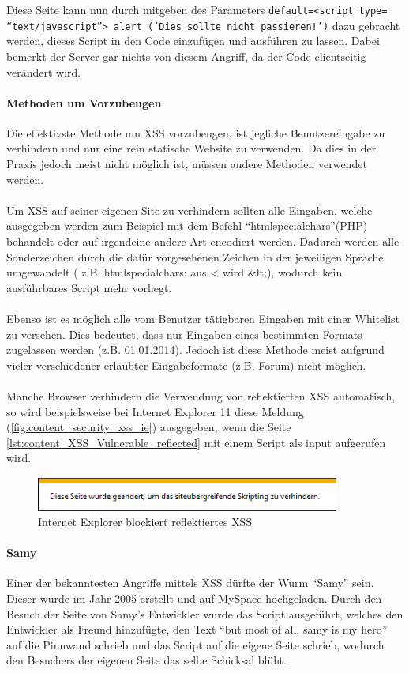 Diese Seite kann nun durch mitgeben des Parameters  \texttt{default=<script type=\\\enquote{text/javascript}> alert ('Dies sollte nicht passieren!')} dazu gebracht werden, dieses Script in den Code einzufügen und ausführen zu lassen. Dabei bemerkt der Server gar nichts von diesem Angriff, da der Code clientseitig verändert wird. 

\paragraph{Methoden um Vorzubeugen}

\label{sec:content_security_cross_site_scripting_Methods}
Die effektivste Methode um XSS vorzubeugen, ist jegliche Benutzereingabe zu verhindern und nur eine rein statische Website zu verwenden. Da dies in der Praxis jedoch meist nicht möglich ist, müssen andere Methoden verwendet werden.\\\\ 
Um XSS auf seiner eigenen Site zu verhindern sollten alle Eingaben, welche ausgegeben werden zum Beispiel mit dem Befehl \enquote{htmlspecialchars}(PHP) behandelt oder auf irgendeine andere Art encodiert werden. Dadurch werden alle Sonderzeichen durch die dafür vorgesehenen Zeichen in der jeweiligen Sprache umgewandelt ( z.B. htmlspecialchars: aus < wird \&lt;), wodurch kein ausführbares Script mehr vorliegt.\\\\
Ebenso ist es möglich alle vom Benutzer tätigbaren Eingaben mit einer Whitelist zu versehen. Dies bedeutet, dass nur Eingaben eines bestimmten Formats zugelassen werden (z.B. 01.01.2014). Jedoch ist diese Methode meist aufgrund vieler verschiedener erlaubter Eingabeformate (z.B. Forum) nicht möglich.\\\\
Manche Browser verhindern die Verwendung von reflektierten XSS automatisch, so wird beispielsweise bei Internet Explorer 11 diese Meldung (\autoref{fig:content_security_xss_ie}) ausgegeben, wenn die Seite \autoref{lst:content_XSS_Vulnerable_reflected} mit einem Script als input aufgerufen wird.

\begin{figure}[H]
\centering
\includegraphics[keepaspectratio=true, width=10cm]{images/screenshots/xss_ie.png}
\caption{Internet Explorer blockiert reflektiertes XSS}
\label{fig:content_security_xss_ie}
\end{figure}

\paragraph{Samy}
Einer der bekanntesten Angriffe mittels XSS dürfte der Wurm \enquote{Samy} sein. Dieser wurde im Jahr 2005 erstellt und auf MySpace hochgeladen. Durch den Besuch der Seite von Samy's Entwickler wurde das Script ausgeführt, welches den Entwickler als Freund hinzufügte, den Text \enquote{but most of all, samy is my hero} auf die Pinnwand schrieb und das Script auf die eigene Seite schrieb, wodurch den Besuchers der eigenen Seite das selbe Schicksal blüht.
